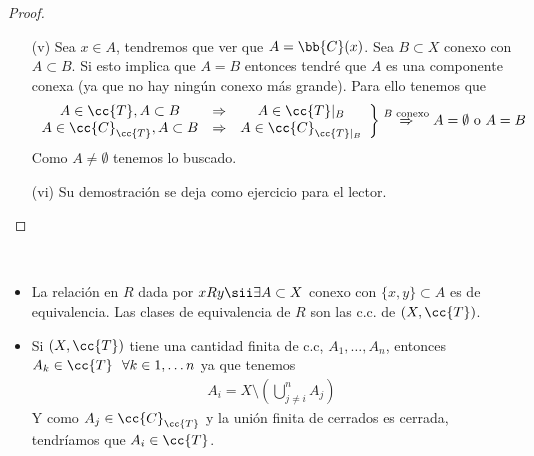 \begin{prop}
\begin{proof}
\begin{enumerate}
            \item[(v)] Sea $x\in A$, tendremos que ver que $A=\bb{C}(x)$. Sea $B\subset X$ conexo con $A\subset B$. Si esto implica que $A=B$ entonces tendré que $A$ es una componente conexa (ya que no hay ningún conexo más grande). Para ello tenemos que 
            \begin{align*}
                \left.
                \begin{array}{ccc}
                    A\in \cc{T}, A\subset B & \Rightarrow & A \in \cc{T}|_B \\
                    A \in \cc{C}_{\cc{T}}, A\subset B & \Rightarrow & A\in \cc{C}_{\cc{T}|_B}\\
                \end{array}
                \right\} \overset{B \text{ conexo}}{\Rightarrow} A =\emptyset \text{ o } A=B
            \end{align*}
            Como $A\neq \emptyset$ tenemos lo buscado.
            \item[(vi)] Su demostración se deja como ejercicio para el lector.
        \end{enumerate}
    \end{proof}
\end{prop}

\begin{observacion}\
    \begin{itemize}
        \item La relación en $R$ dada por $xRy \sii\exists A\subset X$ conexo con $\{x,y\}\subset A$ es de equivalencia. Las clases de equivalencia de $R$ son las c.c. de $(X, \cc{T})$.
        \item Si $(X, \cc{T})$ tiene una cantidad finita de c.c, $A_1,\dots, A_n$, entonces $A_k\in \cc{T}\ \ \forall k\in 1,\dots n$ ya que tenemos 
        \begin{align*}
            A_i=X\setminus \left( \bigcup\limits_{j\neq i}^n A_j\right)
        \end{align*}
        Y como $A_j\in \cc{C}_{\cc{T}}$ y la unión finita de cerrados es cerrada, tendríamos que $A_i\in \cc{T}$.
    \end{itemize}
    \endsquare
\end{observacion}

